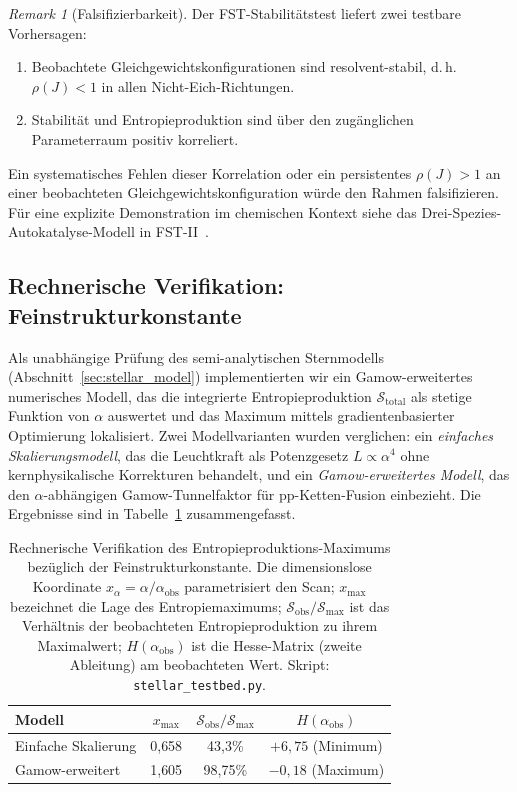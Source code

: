 \documentclass[12pt,a4paper]{article}
\theoremstyle{remark}
\newtheorem{remark}{Remark}
\begin{document}
\begin{remark}[Falsifizierbarkeit]\label{rem:falsifiability-protocol}
Der FST-Stabilit\"atstest liefert zwei testbare Vorhersagen:
\begin{enumerate}[label=(\roman*)]
  \item Beobachtete Gleichgewichtskonfigurationen sind resolvent-stabil,
        d.\,h.\ $\rho(J) < 1$ in allen Nicht-Eich-Richtungen.
  \item Stabilit\"at und Entropieproduktion sind \"uber den zug\"anglichen
        Parameterraum positiv korreliert.
\end{enumerate}
Ein systematisches Fehlen dieser Korrelation oder ein persistentes
$\rho(J) > 1$ an einer beobachteten Gleichgewichtskonfiguration w\"urde
den Rahmen falsifizieren. F\"ur eine explizite Demonstration im
chemischen Kontext siehe das Drei-Spezies-Autokatalyse-Modell in
FST-II~\cite{FSTII}.
\end{remark}

\subsection{Rechnerische Verifikation: Feinstrukturkonstante}
\label{sec:comp-verification-alpha}

Als unabh\"angige Pr\"ufung des semi-analytischen Sternmodells (Abschnitt~\ref{sec:stellar_model}) implementierten wir ein Gamow-erweitertes numerisches Modell, das die integrierte Entropieproduktion $\mathcal{S}_{\text{total}}$ als stetige Funktion von $\alpha$ auswertet und das Maximum mittels gradientenbasierter Optimierung lokalisiert. Zwei Modellvarianten wurden verglichen: ein \emph{einfaches Skalierungsmodell}, das die Leuchtkraft als Potenzgesetz $L \propto \alpha^4$ ohne kernphysikalische Korrekturen behandelt, und ein \emph{Gamow-erweitertes Modell}, das den $\alpha$-abh\"angigen Gamow-Tunnelfaktor f\"ur pp-Ketten-Fusion einbezieht. Die Ergebnisse sind in Tabelle~\ref{tab:comp-verification-alpha} zusammengefasst.

\begin{table}[ht]
\centering
\caption{Rechnerische Verifikation des Entropieproduktions-Maximums bez\"uglich der Feinstrukturkonstante. Die dimensionslose Koordinate $x_\alpha = \alpha / \alpha_{\text{obs}}$ parametrisiert den Scan; $x_{\max}$ bezeichnet die Lage des Entropiemaximums; $\mathcal{S}_{\text{obs}} / \mathcal{S}_{\max}$ ist das Verh\"altnis der beobachteten Entropieproduktion zu ihrem Maximalwert; $H(\alpha_{\text{obs}})$ ist die Hesse-Matrix (zweite Ableitung) am beobachteten Wert. Skript: \texttt{stellar\_testbed.py}.}
\label{tab:comp-verification-alpha}
\begin{tabular}{lccc}
\toprule
\textbf{Modell} & $x_{\max}$ & $\mathcal{S}_{\text{obs}} / \mathcal{S}_{\max}$ & $H(\alpha_{\text{obs}})$ \\
\midrule
Einfache Skalierung & 0{,}658 & 43{,}3\% & $+6{,}75$ (Minimum) \\
Gamow-erweitert & 1{,}605 & 98{,}75\% & $-0{,}18$ (Maximum) \\
\bottomrule
\end{tabular}
\end{table}
\end{document}
